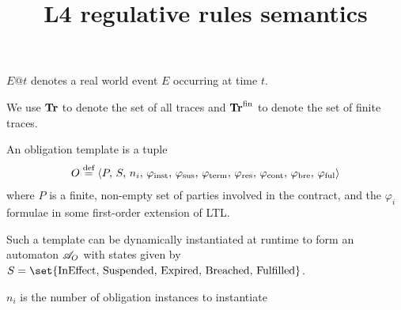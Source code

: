 \documentclass{article}
\title{L4 regulative rules semantics}
\begin{document}
\maketitle


\tableofcontents

\begin{definition} [Event]
  $E@t$ denotes a real world event $E$ occurring at time $t$.
\end{definition}

We use $\mathbf{Tr}$ to denote the set of all traces and $\mathbf{Tr}^\text{fin}$ to denote the
set of finite traces.

\begin{definition} 
  An obligation template is a tuple
  \begin{align*}
    O \stackrel{\text{def}}{=}
    \langle
      P, \, S, \, n_i, \, \varphi_\text{inst}, \,
      \varphi_\text{sus}, \, \varphi_\text{term}, \, \varphi_\text{res}, \, \varphi_\text{cont}, \, \varphi_\text{bre}, \, \varphi_\text{ful}
    \rangle
  \end{align*}
  where $P$ is a finite, non-empty set of parties involved in the contract,
  and the $\varphi_i$ formulae in some first-order extension of LTL.

  Such a template can be dynamically instantiated at runtime to form an
  automaton $\mathscr{A}_O$ with states given by
  $S = \set{\ineffstate, \, \susstate, \, \expstate, \, \brestate, \, \fulstate}$.

  $n_i$ is the number of obligation instances to instantiate
\end{definition}
\end{document}
